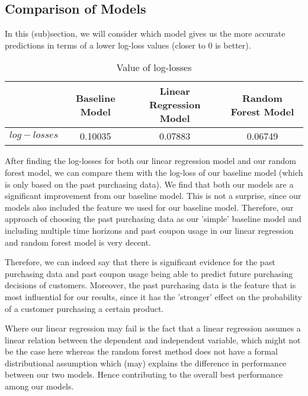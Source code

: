 \subsection{Comparison of Models}
In this (sub)section, we will consider which model gives us the more accurate
predictions in terms of a lower log-loss values (closer to 0 is better).

\begin{table}[H]
    \centering
    \begin{tabular}{| c | c | c | c |}
        \hline
        & Baseline Model & Linear Regression Model & Random Forest Model \\
        \hline
        $log-losses$ & 0.10035 & 0.07883 & 0.06749 \\
        \hline
    \end{tabular}
    \caption{Value of log-losses}
\end{table}

After finding the log-losses for both our linear regression model and our random
forest model, we can compare them with the log-loss of our baseline model (which
is only based on the past purchasing data). We find that both our models are a
significant improvement from our baseline model. This is not a surprise, since
our models also included the feature we used for our baseline model. Therefore,
our approach of choosing the past purchasing data as our 'simple' baseline model
and including multiple time horizons and past coupon usage in our linear
regression and random forest model is very decent.

Therefore, we can indeed say that there is significant evidence for the past
purchasing data and past coupon usage being able to predict future purchasing
decisions of customers. Moreover, the past purchasing data is the feature that
is most influential for our results, since it has the 'stronger' effect on the
probability of a customer purchasing a certain product.

Where our linear regression may fail is the fact that a linear regression
assumes a linear relation between the dependent and independent variable, which might
not be the case here whereas the random forest method does not have a formal
distributional assumption which (may) explains the difference in performance between
our two models. Hence contributing to the overall best performance among our
models.
